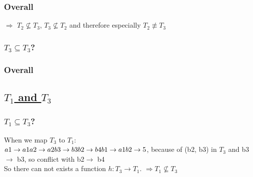 \documentclass[12pt]{article}
\begin{document}
	\subsubsection*{Overall} %
	$\Rightarrow$ $T_2\not\subseteq T_3$, $T_3 \not\subseteq T_2$ and therefore especially $T_2 \not\equiv T_3$ 
	
	\subsubsection*{$T_3 \subseteq T_3$?} %
%	
	\subsubsection*{Overall} %
	
	\subsection*{\underline{$T_1$ and $T_3$}}
	\subsubsection*{$T_1 \subseteq T_3$?}

When we map $T_3$ to $T_1$:\\
$a1\rightarrow a1\\
a2\rightarrow a2\\
b3\rightarrow b3\\
b2\rightarrow b4\\
b1\rightarrow a1\\
b2\rightarrow 5$, because of (b2, b3) in $T_3$ and b3$\rightarrow$ b3, so conflict with b2$\rightarrow$ b4 \\
So there can not exists a function $h: T_3 \rightarrow T_1$. $\Rightarrow T_1 \not\subseteq T_3$
\end{document}
